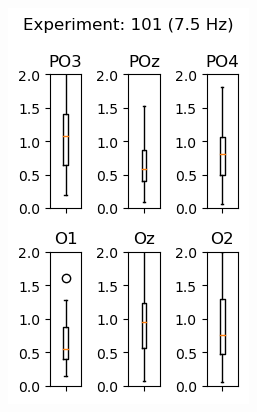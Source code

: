 \begin{figure}[h]
\begin{subfigure}{0.3\textwidth}
        \includegraphics[width=\linewidth]{images/appendix/10175.png}
        \label{fig:10175}
    \end{subfigure}
    \hfill
    \begin{subfigure}{0.3\textwidth}

\end{subfigure}
\end{figure}
